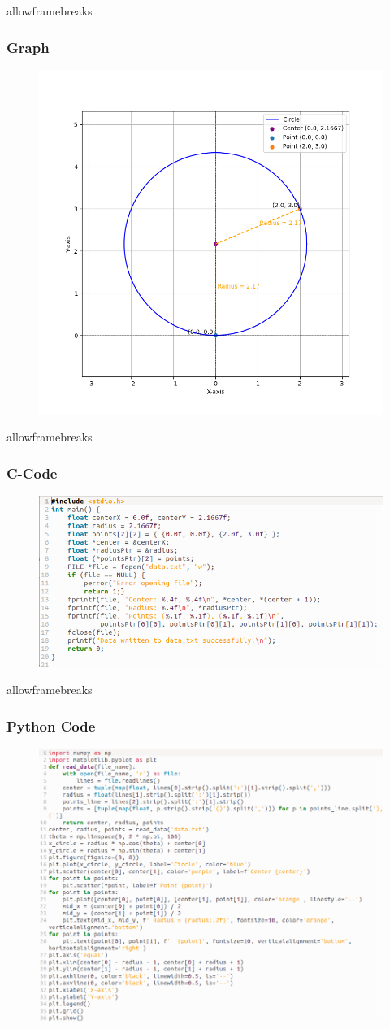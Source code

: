 \documentclass{beamer}
\begin{document}
\begin{frame}{allowframebreaks}
\frametitle{Graph}
\begin{figure}[ht]
\centering
\includegraphics[width=0.7\linewidth]{figs/Fig1.png}
\end{figure}
\end{frame}


\begin{frame}{allowframebreaks}
\frametitle{C-Code}
\begin{figure}[ht]
\centering
\includegraphics[width=0.7\linewidth]{figs/Fig2.png}
\end{figure}
\end{frame}


\begin{frame}{allowframebreaks}
\frametitle{Python Code}
\begin{figure}[ht]
\centering
\includegraphics[width=0.7\linewidth]{figs/Fig3.png}        \end{figure}
\end{frame}
\end{document}

